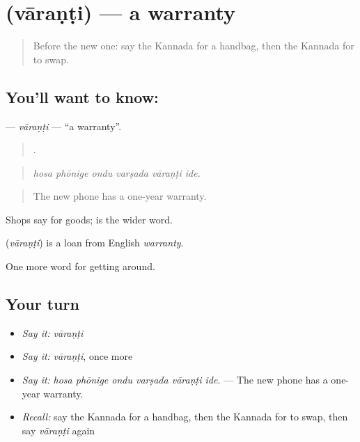 \section[\texorpdfstring{\kn{ವಾರಂಟಿ} (vāraṇṭi)}{ವಾರಂಟಿ (vāraṇṭi)}]{ (vāraṇṭi) — a warranty}

\label{lesson:KA-C469-varanti}



\begin{quote}
Before the new one: say the Kannada for a handbag, then the Kannada for to swap.
\end{quote}

\subsection*{You'll want to know: }
\textbf{} — \emph{vāraṇṭi} — \textquotedblleft{}a warranty\textquotedblright{}.

\begin{quote}
     .
\end{quote}

\begin{quote}
\emph{hosa phōnige ondu varṣada vāraṇṭi ide.}
\end{quote}

\begin{quote}
The new phone has a one-year warranty.
\end{quote}

Shops say  for goods;  is the wider word.

\begin{cousinweb}
\textbf{} (\emph{vāraṇṭi}) is a loan from English \emph{warranty}.
\end{cousinweb}

\begin{grammarlens}[title={What you've built}]
One more word for getting around.
\end{grammarlens}

\subsection*{Your turn}
\begin{itemize}
\raggedright
  \item \emph{Say it:} \emph{vāraṇṭi}
  \item \emph{Say it:} \emph{vāraṇṭi}, once more
  \item \emph{Say it:} \emph{hosa phōnige ondu varṣada vāraṇṭi ide.} — The new phone has a one-year warranty.
  \item \emph{Recall:} say the Kannada for a handbag, then the Kannada for to swap, then say \emph{vāraṇṭi} again
\end{itemize}

